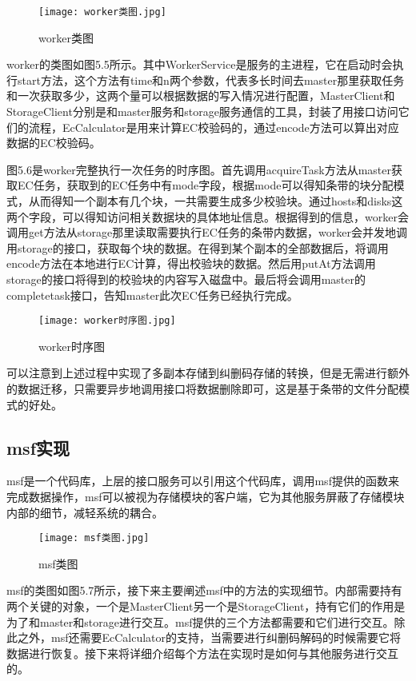 \begin{figure}
  \centering
  \texttt{[image: worker类图.jpg]}
  \caption{worker类图}
\end{figure}

worker的类图如图5.5所示。其中WorkerService是服务的主进程，它在启动时会执行start方法，这个方法有time和n两个参数，代表多长时间去master那里获取任务和一次获取多少，这两个量可以根据数据的写入情况进行配置，MasterClient和StorageClient分别是和master服务和storage服务通信的工具，封装了用接口访问它们的流程，EcCalculator是用来计算EC校验码的，通过encode方法可以算出对应数据的EC校验码。

图5.6是worker完整执行一次任务的时序图。首先调用acquireTask方法从master获取EC任务，获取到的EC任务中有mode字段，根据mode可以得知条带的块分配模式，从而得知一个副本有几个块，一共需要生成多少校验块。通过hosts和disks这两个字段，可以得知访问相关数据块的具体地址信息。根据得到的信息，worker会调用get方法从storage那里读取需要执行EC任务的条带内数据，worker会并发地调用storage的接口，获取每个块的数据。在得到某个副本的全部数据后，将调用encode方法在本地进行EC计算，得出校验块的数据。然后用putAt方法调用storage的接口将得到的校验块的内容写入磁盘中。最后将会调用master的completetask接口，告知master此次EC任务已经执行完成。

\begin{figure}
  \centering
  \texttt{[image: worker时序图.jpg]}
  \caption{worker时序图}
\end{figure}

可以注意到上述过程中实现了多副本存储到纠删码存储的转换，但是无需进行额外的数据迁移，只需要异步地调用接口将数据删除即可，这是基于条带的文件分配模式的好处。

\subsection{msf实现}%
msf是一个代码库，上层的接口服务可以引用这个代码库，调用msf提供的函数来完成数据操作，msf可以被视为存储模块的客户端，它为其他服务屏蔽了存储模块内部的细节，减轻系统的耦合。

\begin{figure}
  \centering
  \texttt{[image: msf类图.jpg]}
  \caption{msf类图}
\end{figure}

msf的类图如图5.7所示，接下来主要阐述msf中的方法的实现细节。内部需要持有两个关键的对象，一个是MasterClient另一个是StorageClient，持有它们的作用是为了和master和storage进行交互。msf提供的三个方法都需要和它们进行交互。除此之外，msf还需要EcCalculator的支持，当需要进行纠删码解码的时候需要它将数据进行恢复。接下来将详细介绍每个方法在实现时是如何与其他服务进行交互的。

